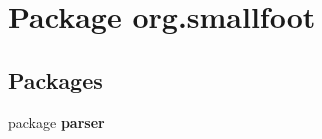 \section{Package org.\-smallfoot}
\label{namespaceorg_1_1smallfoot}
\subsection*{Packages}
\begin{DoxyCompactItemize}
\item 
package {\bf parser}
\end{DoxyCompactItemize}

